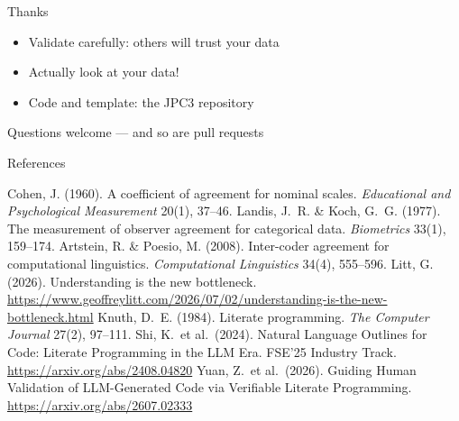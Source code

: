 \documentclass[xetex,aspectratio=169]{beamer}
\begin{document}
\begin{frame}{Thanks}
  \begin{itemize}
  \item Validate carefully: others will trust your data
  \item Actually look at your data!
  \item Code and template: the JPC3 repository
  \end{itemize}
  \bigskip
  \centering Questions welcome --- and so are pull requests
\end{frame}

\begin{frame}[allowframebreaks]{References}
  \footnotesize
  \begin{thebibliography}{}
   Cohen, J. (1960).
    A coefficient of agreement for nominal scales.
    \textit{Educational and Psychological Measurement} 20(1), 37--46.
   Landis, J.~R. \& Koch, G.~G. (1977).
    The measurement of observer agreement for categorical data.
    \textit{Biometrics} 33(1), 159--174.
   Artstein, R. \& Poesio, M. (2008).
    Inter-coder agreement for computational linguistics.
    \textit{Computational Linguistics} 34(4), 555--596.
   Litt, G. (2026).
    Understanding is the new bottleneck.
    \url{https://www.geoffreylitt.com/2026/07/02/understanding-is-the-new-bottleneck.html}
   Knuth, D.~E. (1984).
    Literate programming. \textit{The Computer Journal} 27(2), 97--111.
   Shi, K.\ et al.\ (2024).
    Natural Language Outlines for Code: Literate Programming in the LLM Era.
    FSE'25 Industry Track. \url{https://arxiv.org/abs/2408.04820}
   Yuan, Z.\ et al.\ (2026).
    Guiding Human Validation of LLM-Generated Code via Verifiable Literate Programming.
    \url{https://arxiv.org/abs/2607.02333}
  \end{thebibliography}
\end{frame}
\end{document}
